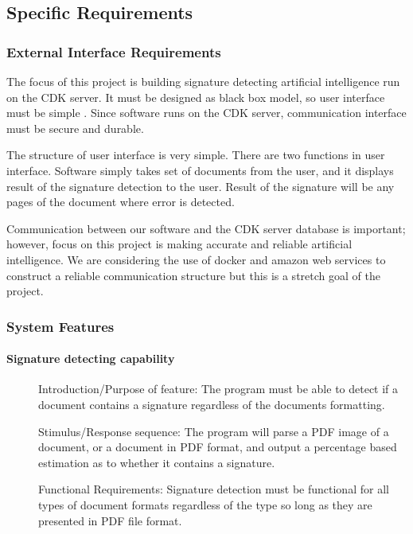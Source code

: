 \documentclass[article, onecolumn, draftclsnofoot,10pt, compsoc]{IEEEtran}
\begin{document}
\subsection{Specific Requirements}

\subsubsection{External Interface Requirements}
The focus of this project is building signature detecting artificial intelligence run on the CDK server. It must be designed as black box model, so user interface must be simple . Since software runs on the CDK server, communication interface must be secure and durable. 

The structure of user interface is very simple. There are two functions in user interface. Software simply takes set of documents from the user, and it displays result of the signature detection to the user. Result of the signature will be any pages of the document where error is detected.

Communication between our software and the CDK server database is important; however, focus on this project is making accurate and reliable artificial intelligence. We are considering the use of docker and amazon web services to construct a reliable communication structure but this is a stretch goal of the project.

\subsubsection{System Features}
\paragraph{Signature detecting capability}\vspace{.5cm}
\begin{description}
\item [] Introduction/Purpose of feature: The program must be able to detect if a document contains a signature regardless of the documents formatting.
\item [] Stimulus/Response sequence: The program will parse a PDF image of a document, or a document in PDF format, and output a percentage based estimation as to whether it contains a signature.
\item [] Functional Requirements: Signature detection must be functional for all types of document formats regardless of the type so long as they are presented in PDF file format. 
\end{description}
\end{document}
